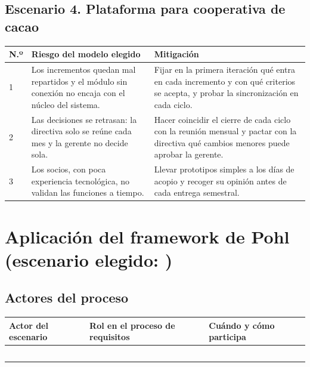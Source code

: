 \documentclass[11pt,a4paper]{article}
\begin{document}
	\subsection{Escenario 4. Plataforma para cooperativa de cacao}
	
	\small
	\begin{tabularx}{\textwidth}{|p{1.5cm}|Y|Y|}
		\hline
		\textbf{N.º} &
		\textbf{Riesgo del modelo elegido} &
		\textbf{Mitigación} \\ \hline
		
		1 &
		Los incrementos quedan mal repartidos y el módulo sin conexión no encaja con el núcleo del sistema. &
		Fijar en la primera iteración qué entra en cada incremento y con qué criterios se acepta, y probar la sincronización en cada ciclo. \\ \hline
		
		2 &
		Las decisiones se retrasan: la directiva solo se reúne cada mes y la gerente no decide sola. &
		Hacer coincidir el cierre de cada ciclo con la reunión mensual y pactar con la directiva qué cambios menores puede aprobar la gerente. \\ \hline
		
		3 &
		Los socios, con poca experiencia tecnológica, no validan las funciones a tiempo. &
		Llevar prototipos simples a los días de acopio y recoger su opinión antes de cada entrega semestral. \\ \hline
	\end{tabularx}
	\normalsize
	
	
	\section{Aplicación del framework de Pohl
		(escenario elegido: \underline{\hspace{3cm}})}
	
	\subsection{Actores del proceso}
	
	\begin{tabularx}{\textwidth}{|Y|Y|Y|}
		\hline
		\textbf{Actor del escenario} &
		\textbf{Rol en el proceso de requisitos} &
		\textbf{Cuándo y cómo participa} \\ \hline
		& & \\[1cm] \hline
		& & \\[1cm] \hline
		& & \\[1cm] \hline
		& & \\[1cm] \hline
		& & \\[1cm] \hline
	\end{tabularx}
	
\end{document}
